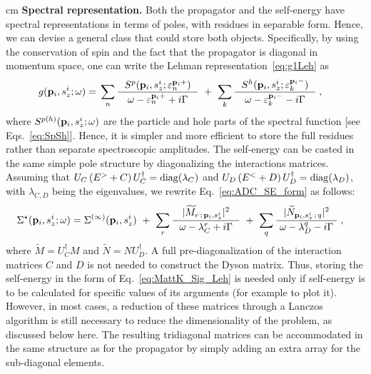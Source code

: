  cm
{\bf Spectral representation.}
Both the propagator and the self-energy have spectral representations in terms of poles, with residues in separable form. Hence, we can devise a general class that could store both objects. Specifically, by using the conservation of spin and the fact that the propagator is diagonal in momentum space, one can write the Lehman representation~\eqref{eq:g1Leh} as
\begin{align}
   g({\bf p}_i, s_z^i; \omega) ={}& \sum_n \frac{~~ S^{p}({\bf p}_i, s_z^i; \varepsilon^{{\bf p}_i +}_n ) ~~}{\omega - \varepsilon^{{\bf p}_i +}_n + i \Gamma}
        ~ + ~                                     \sum_k \frac{~~ S^{h}({\bf p}_i, s_z^i; \varepsilon^{{\bf p}_i -}_k ) ~~}{\omega - \varepsilon^{{\bf p}_i -}_k - i \Gamma} \; ,
\label{eq:MattK_gsp_Leh}
\end{align}
where $S^{p(h)}({\bf p}_i, s_z^i; \omega )$ are the particle and hole parts of the spectral function [see Eqs.~\eqref{eq:SpSh}]. Hence, it is simpler and more
efficient to store the full residues rather than separate spectroscopic amplitudes. The self-energy can be casted in the same simple pole structure 
by diagonalizing the interactions matrices. Assuming that \hbox{$U_C \,(E^>+C) \, U_C^\dagger = \mathrm{diag}(\lambda_C)$} and \hbox{$U_D \, (E^<+D) \, U_D^\dagger = \mathrm{diag}(\lambda_D)$},
with $\lambda_{C,D}$ being the eigenvalues, we  rewrite Eq.~\eqref{eq:ADC_SE_form} as follows:
\begin{align}
   \Sigma^\star({\bf p}_i, s_z^i; \omega) ={}& \Sigma^{(\infty)}({\bf p}_i, s_z^i) 
       ~ + ~      \sum_r\frac{ | \widetilde{M}_{r\, ; \, {\bf p}_i, s_z^i} |^2 }{ ~~ \omega -  \lambda_C^r + i \Gamma ~~}
       ~ + ~      \sum_q \frac{ | \widetilde{N}_{{\bf p}_i, s_z^i \, ; \, q} |^2 }{ ~ \omega -  \lambda_D^q - i \Gamma ~} \; ,
\label{eq:MattK_Sig_Leh}
\end{align}
where $\widetilde{M} = U_C^\dagger M$  and $\widetilde{N} = N U_D^\dagger$.  
A full pre-diagonalization of the interaction matrices $C$ and $D$ is not needed to construct the Dyson matrix. Thus, storing the self-energy in the form of Eq.~\eqref{eq:MattK_Sig_Leh} is  needed only if  self-energy is to be calculated for specific values of its arguments (for example to plot it). However, in most cases, a reduction of these matrices through a Lanczos algorithm is still necessary to reduce the dimensionality of the problem, as discussed below here. The resulting tridiagonal matrices can be accommodated in the same structure as for the propagator by simply adding an extra array for the sub-diagonal elements.
